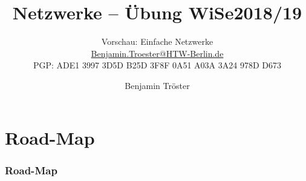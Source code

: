 \documentclass[xcolor=dvipsnames, aspectratio=169]{beamer}
\begin{document}

\title{Netzwerke -- Übung WiSe2018/19}
\subtitle{Vorschau: Einfache Netzwerke\\
		\href{mailto:Benjamin.Troester@HTW-Berlin.de}{Benjamin.Troester@HTW-Berlin.de}\\
		PGP: ADE1 3997 3D5D B25D 3F8F 0A51 A03A 3A24 978D D673 }

\author{Benjamin Tröster}

\date{}

\begin{frame}
\titlepage

\end{frame}

\section*{Road-Map}
\begin{frame}
\frametitle{Road-Map}
\begin{multicols}{2}
  \tableofcontents
\end{multicols}
\end{frame}
\end{document}
